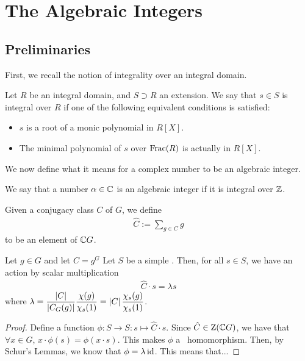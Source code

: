 \section{The Algebraic Integers}

\subsection{Preliminaries}

First, we recall the notion of integrality over an integral domain.

\begin{boxdefinition}[Integrality]
    Let $R$ be an integral domain, and $S \supset R$ an extension. We say that $s \in S$ is integral over $R$ if one of the following equivalent conditions is satisfied:
    \begin{itemize}
        \item $s$ is a root of a monic polynomial in $R[X]$.
        \item The minimal polynomial of $s$ over $\operatorname{Frac}\!\left( R \right)$ is actually in $R[X]$.
    \end{itemize}
\end{boxdefinition}
We now define what it means for a complex number to be an algebraic integer.
\begin{boxdefinition}
    We say that a number $\alpha \in \mathbb{C}$ is an algebraic integer if it is integral over $\mathbb{Z}$.
\end{boxdefinition}

\begin{boxnotation}
    Given a conjugacy class $C$ of $G$, we define
    \begin{align}
        \hat{C} := \sum_{g \in C} g
    \end{align}
    to be an element of $\mathbb{C} G$.
\end{boxnotation}

\begin{lemma}
    Let $g \in G$ and let $C = g^G$ %
    Let $S$ be a simple \CGM. Then, for all $s \in S$, we have an action by scalar multiplication
    \begin{align*}
        \hat{C} \cdot s = \lambda s
    \end{align*}
    where $\displaystyle \lambda = \frac{\left\lvert C \right\rvert}{\left\lvert C_G(g) \right\rvert} \frac{\chi(g)}{\chi_s(1)} = \left\lvert C \right\rvert \frac{\chi_s(g)}{\chi_s(1)}$.
\end{lemma}
\begin{proof}
    Define a function $\phi : S \to S : s \mapsto \hat{C} \cdot s$. Since $\hat{C} \in \operatorname{Z}\!\left( \mathbb{C} G \right)$, %
    we have that $\forall x \in G$, $x \cdot \phi(s) = \phi(x \cdot s)$. This makes $\phi$ a \CGM\ homomorphism. Then, by Schur's Lemmas, we know that $\phi = \lambda \operatorname{id}$. This means that... %
\end{proof}

